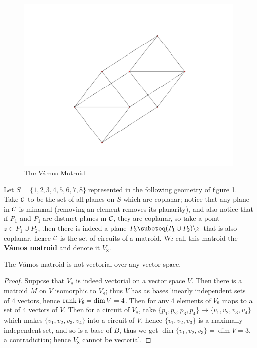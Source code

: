 \begin{example}
    \begin{figure}
        \centering
        \includegraphics[scale = 0.4]{Figures/Chapter1/vamosmatroid.png}
        \caption{The Vámos Matroid.}
        \label{fig:1.1}
    \end{figure}

    Let $S=\{1,2,3,4,5,6,7,8\}$ represented in the following geometry of figure \ref{fig:1.1}. Take
    $\mathcal{C}$ to be the set of all planes on  $S$ which are coplanar; notice that any plane in $\mathcal{C}$ is
    minamal  (removing an element removes its planarity), and also notice that if $P_1$ and $ P_1$
    are distinct planes in $\mathcal{C}$, they are coplanar, so take a point $z \in P_1 \cup P_2$, then
    there is indeed a plane $ P_3 \subeteq \com{(P_1 \cup P_2)}{z}$ that is also coplanar. hence
    $\mathcal{C}$ is the set of circuits of a matroid. We call this matroid the \textbf{Vámos matroid} and
    denote it $V_8$.
\end{example} 

\begin{proposition}\label{1.2.4}
    The Vámos matroid is not vectorial over any vector space.
\end{proposition}
\begin{proof}
    Suppose that $ V_8$ is indeed vectorial on a vector space $V$. Then there is a matroid $M$ on
    $V$ isomorphic to  $ V_8$; thus $V$ has as bases linearly independent sets of  $4$ vectors,
    hence  $\operatorname{rank}{V_8}=\dim{V}=4$. Then for any $4$ elements of $V_8$ maps to a set of $4$ vectors
    of  $V$. Then for a circuit of $V_8$, take $ \{p_1,p_2,p_3,p_4\} \rightarrow
    \{v_1,v_2,v_3,v_4\}$ which makes $\{v_1,v_2,v_3,v_4\}$ into a circuit of $V$, hence
    $\{v_1,v_2,v_3\}$ is a maximally independent set, and so is a base of $B$, thus we get
    $\dim{\{v_1,v_2,v_3\}}=\dim{V}=3$, a contradiction; hence $ V_8$ cannot be vectorial.
\end{proof}

